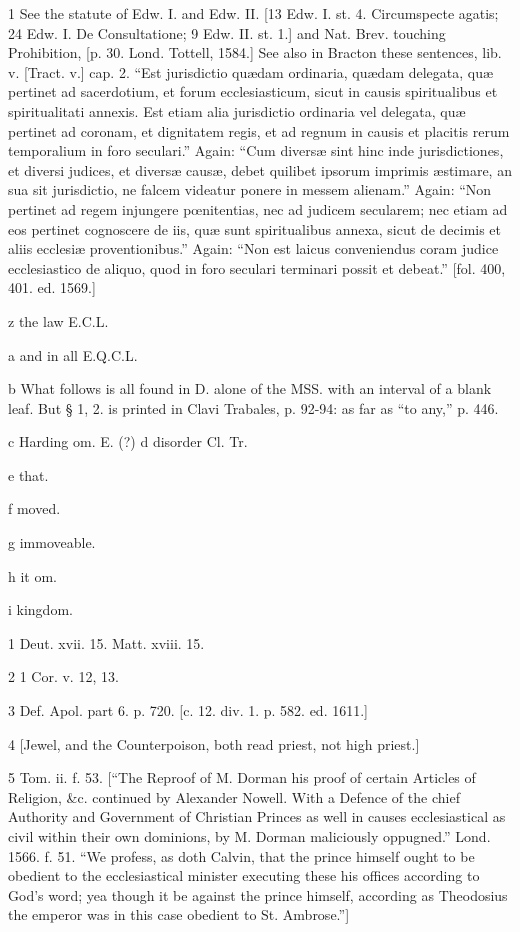 1
See the statute of Edw. I. and Edw. II. [13 Edw. I. st. 4. Circumspecte agatis; 24 Edw. I. De Consultatione; 9 Edw. II. st. 1.] and Nat. Brev. touching Prohibition, [p. 30. Lond. Tottell, 1584.] See also in Bracton these sentences, lib. v. [Tract. v.] cap. 2. “Est jurisdictio quædam ordinaria, quædam delegata, quæ pertinet ad sacerdotium, et forum ecclesiasticum, sicut in causis spiritualibus et spiritualitati annexis. Est etiam alia jurisdictio ordinaria vel delegata, quæ pertinet ad coronam, et dignitatem regis, et ad regnum in causis et placitis rerum temporalium in foro seculari.” Again: “Cum diversæ sint hinc inde jurisdictiones, et diversi judices, et diversæ causæ, debet quilibet ipsorum imprimis æstimare, an sua sit jurisdictio, ne falcem videatur ponere in messem alienam.” Again: “Non pertinet ad regem injungere pœnitentias, nec ad judicem secularem; nec etiam ad eos pertinet cognoscere de iis, quæ sunt spiritualibus annexa, sicut de decimis et aliis ecclesiæ proventionibus.” Again: “Non est laicus conveniendus coram judice ecclesiastico de aliquo, quod in foro seculari terminari possit et debeat.” [fol. 400, 401. ed. 1569.]

z
the law E.C.L.

a
and in all E.Q.C.L.

b
What follows is all found in D. alone of the MSS. with an interval of a blank leaf. But § 1, 2. is printed in Clavi Trabales, p. 92-94: as far as “to any,” p. 446.

c Harding om. E. (?)
d
disorder Cl. Tr.

e
that.

f
moved.

g
immoveable.

h
it om.

i
kingdom.

1
Deut. xvii. 15. Matt. xviii. 15.

2
1 Cor. v. 12, 13.

3
Def. Apol. part 6. p. 720. [c. 12. div. 1. p. 582. ed. 1611.]

4
[Jewel, and the Counterpoison, both read priest, not high priest.]

5
Tom. ii. f. 53. [“The Reproof of M. Dorman his proof of certain Articles of Religion, &c. continued by Alexander Nowell. With a Defence of the chief Authority and Government of Christian Princes as well in causes ecclesiastical as civil within their own dominions, by M. Dorman maliciously oppugned.” Lond. 1566. f. 51. “We profess, as doth Calvin, that the prince himself ought to be obedient to the ecclesiastical minister executing these his offices according to God’s word; yea though it be against the prince himself, according as Theodosius the emperor was in this case obedient to St. Ambrose.”]

